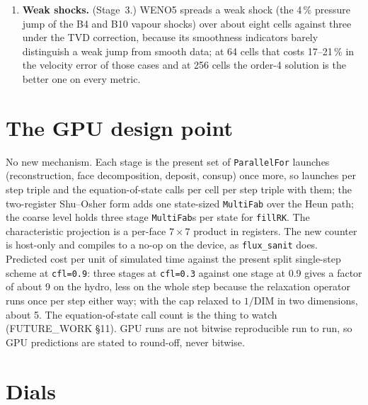 \documentclass[11pt,a4paper]{article}
\newcommand{\code}[1]{\texttt{\small #1}}
\begin{document}
\begin{enumerate}[nosep]
      must use the same edge values as the fluctuations or the $\alpha$
      and mass updates part company at a contact; it is not built.  So
      the conserved slots are at the reconstruction's order and the
      non-conserved slots are fourth order only in uniform flow.
\item \textbf{Weak shocks.}  (Stage~3.)  WENO5 spreads a weak shock
      (the 4\,\% pressure jump of the B4 and B10 vapour shocks) over
      about eight cells against three under the TVD correction, because
      its smoothness indicators barely distinguish a weak jump from smooth
      data; at 64 cells that costs 17--21\,\% in the velocity error of
      those cases and at 256 cells the order-4 solution is the better one
      on every metric.
\end{enumerate}

\section{The GPU design point}
\label{sec:gpu}

No new mechanism.  Each stage is the present set of \code{ParallelFor}
launches (reconstruction, face decomposition, deposit, consup) once more,
so launches per step triple and the equation-of-state calls per cell per
step triple with them; the two-register Shu--Osher form adds one state-sized
\code{MultiFab} over the Heun path; the coarse level holds three stage
\code{MultiFab}s per state for \code{fillRK}.  The characteristic
projection is a per-face $7\times7$ product in registers.  The new counter
is host-only and compiles to a no-op on the device, as \code{flux\_sanit}
does.  Predicted cost per unit of simulated time against the present split
single-step scheme at \code{cfl=0.9}: three stages at \code{cfl=0.3}
against one stage at 0.9 gives a factor of about 9 on the hydro, less on
the whole step because the relaxation operator runs once per step either
way; with the cap relaxed to $1/\mathrm{DIM}$ in two dimensions, about 5.
The equation-of-state call count is the thing to watch (FUTURE\_WORK
\S11).  GPU runs are not bitwise reproducible run to run, so GPU
predictions are stated to round-off, never bitwise.

\section{Dials}
\label{sec:dials}
\end{document}
